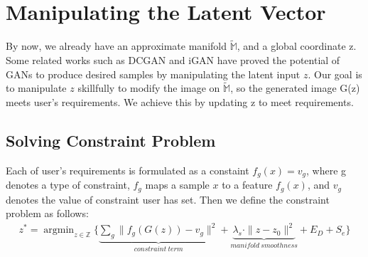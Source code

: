\section{Manipulating the Latent Vector}
By now, we already have an approximate manifold $\widetilde{\mathbb{M}}$, and a global coordinate z. Some related works such as DCGAN and iGAN\cite{zhu2016generative} have proved the potential of GANs to produce desired samples by manipulating the latent input $z$. Our goal is to manipulate $z$ skillfully to modify the image on $\widetilde{\mathbb{M}}$, so the generated image G(z) meets user's requirements. We achieve this by updating z to meet requirements.

\subsection{Solving Constraint Problem}
Each of user's requirements is formulated as a constaint $f_g(x)=v_g$, where g denotes a type of constraint, $f_g$ maps a sample $x$ to a feature $f_g(x)$, and $v_g$ denotes the value of constraint user has set. Then we define the constraint problem as follows:
\begin{equation}
\begin{aligned}
z^* = \mathop{\arg\min}_{z \in \mathbb{Z}} \{\underbrace{\sum_{g}\|f_g(G(z))-v_g\|^2}_{constraint\ term} +\underbrace{\lambda_s\cdot\|z-z_0\|^2}_{manifold\ smoothness} + E_D + S_e \}
\end{aligned}
\end{equation}
